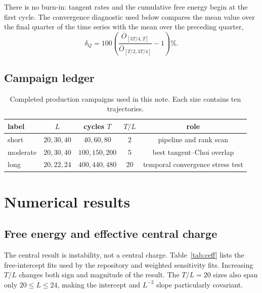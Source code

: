 \documentclass[aps,prb,onecolumn,nofootinbib,superscriptaddress]{revtex4-2}
\begin{document}
There is no burn-in: tangent rates and the cumulative free energy begin at the first cycle.
The convergence diagnostic used below compares the mean value over the final quarter of the
time series with the mean over the preceding quarter,
\begin{equation}
 \delta_Q=100\left(\frac{\overline O_{[3T/4,T]}}
 {\overline O_{[T/2,3T/4]}}-1\right)\% .
\end{equation}

\subsection{Campaign ledger}

\begin{table}[b]
\caption{Completed production campaigns used in this note.  Each size contains ten
trajectories.}
\label{tab:ledger}
\begin{ruledtabular}
\begin{tabular}{lcccc}
label & $L$ & cycles $T$ & $T/L$ & role \\
\hline
short & $20,30,40$ & $40,60,80$ & 2 & pipeline and rank scan \\
moderate & $20,30,40$ & $100,150,200$ & 5 & best tangent--Choi overlap \\
long & $20,22,24$ & $400,440,480$ & 20 & temporal convergence stress test \\
\end{tabular}
\end{ruledtabular}
\end{table}

\section{Numerical results}

\subsection{Free energy and effective central charge}

The central result is instability, not a central charge.  Table~\ref{tab:ceff} lists the
free-intercept fits used by the repository and weighted sensitivity fits.  Increasing
$T/L$ changes both sign and magnitude of the result.  The $T/L=20$ sizes also span only
$20\leq L\leq24$, making the intercept and $L^{-2}$ slope particularly covariant.
\end{document}
